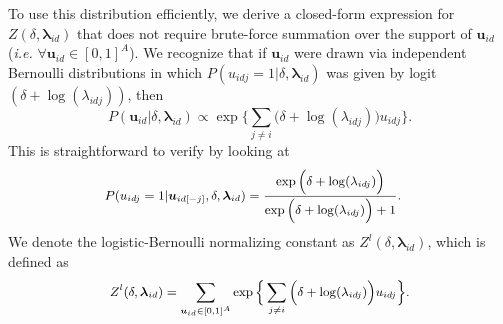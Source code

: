\documentclass[twoside]{article}
\begin{document}
  	 To use this distribution efficiently, we derive a closed-form expression for $Z(\delta,\boldsymbol{\lambda}_{id})$ that does not require brute-force summation over the support of $\boldsymbol{u}_{id}$ (\textit{i.e.} $\forall \boldsymbol{u}_{id} \in [0,1]^A$). We recognize that if $\boldsymbol{u}_{id}$ were drawn via independent Bernoulli distributions in which $P({u}_{idj}=1|\delta, \boldsymbol{\lambda}_{id})$ was given by logit$(\delta+\log(\lambda_{idj}))$, then \begin{equation*}
  	 P(\boldsymbol{u}_{id}|\delta, \boldsymbol{\lambda}_{id}) \propto \exp\Big\{\sum_{j \neq i } \Big(\delta+\log(\lambda_{idj})\Big)u_{idj}\Big\}.  	 
  	 \end{equation*}
  	 This is straightforward to verify by looking at 
  	 \begin{equation*}
  	   	 \footnotesize
  	 \begin{aligned}
  &P(u_{idj}=1|\boldsymbol{u}_{id[-j]}, \delta, \boldsymbol{\lambda}_{id})
  	 =\frac{ \exp{\Big(\delta+\log(\lambda_{idj})\Big)}}{\exp{\Big(\delta+\log(\lambda_{idj})\Big)} + 1}.\end{aligned}\end{equation*}
  	 We denote the logistic-Bernoulli normalizing constant as $Z^{l}(\delta,\boldsymbol{\lambda}_{id})$, which is defined as 
  	 \begin{equation*}
  	   	 \footnotesize
  	 Z^{l}(\delta,\boldsymbol{\lambda}_{id})=\sum_{\boldsymbol{u}_{id} \in [0,1]^{A}} \exp\Big\{\sum_{j\neq i} \Big(\delta+\log(\lambda_{idj})\Big)u_{idj}\Big\}.
  	 \end{equation*}
  	 
\end{document}

